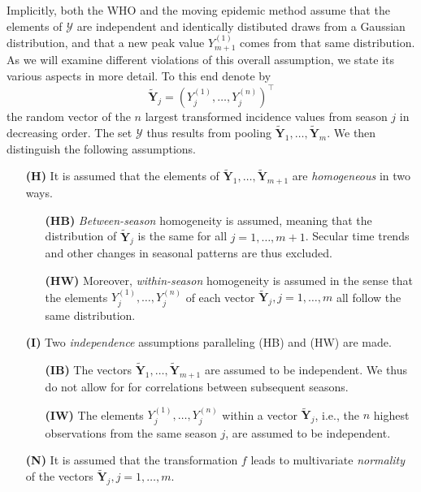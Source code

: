 \documentclass[12pt]{article}
\begin{document}
Implicitly, both the WHO and the moving epidemic method assume that the elements of $\mathcal{Y}$ are independent and identically distibuted draws from a Gaussian distribution, and that a new peak value $Y_{m + 1}^{(1)}$ comes from that same distribution. As we will examine different violations of this overall assumption, we state its various aspects in more detail. To this end denote by
\begin{equation}
\tilde{\mathbf{Y}}_j = (Y^{(1)}_j, \dots, Y^{(n)}_j)^\top\label{eq:Y_tilde}
\end{equation}
the random vector of the $n$ largest transformed incidence values from season $j$ in decreasing order. The set $\mathcal{Y}$ thus results from pooling $\tilde{\mathbf{Y}}_1, \dots, \tilde{\mathbf{Y}}_m$. We then distinguish the following assumptions.
\begin{itemize}
\item[\textbf{(H)}] It is assumed that the elements of $\tilde{\mathbf{Y}}_1, \dots, \tilde{\mathbf{Y}}_{m + 1}$ are \textit{homogeneous} in two ways.
\begin{itemize}
\item[\textbf{(HB)}] \textit{Between-season} homogeneity is assumed, meaning that the distribution of $\tilde{\mathbf{Y}}_j$ is the same for all $j = 1, \dots, m + 1$. Secular time trends and other changes in seasonal patterns are thus excluded.
\item[\textbf{(HW)}] Moreover, \textit{within-season} homogeneity is assumed in the sense that the elements $Y_j^{(1)}, \dots, Y_j^{(n)}$ of each vector $\tilde{\mathbf{Y}}_j, j = 1, \dots, m$ all follow the same distribution.
\end{itemize}
\item[\textbf{(I)}] Two \textit{independence} assumptions paralleling (HB) and (HW) are made.
\begin{itemize}
\item[\textbf{(IB)}] The vectors $\tilde{\mathbf{Y}}_1, \dots, \tilde{\mathbf{Y}}_{m + 1}$ are assumed to be independent. We thus do not allow for for correlations between subsequent seasons.
\item[\textbf{(IW)}] The elements $Y_j^{(1)}, \dots, Y_j^{(n)}$ within a vector $\tilde{\mathbf{Y}}_j$, i.e., the $n$ highest observations from the same season $j$, are assumed to be independent.
\end{itemize}
\item[\textbf{(N)}] It is assumed that the transformation $f$ leads to multivariate \textit{normality} of the vectors $\tilde{\mathbf{Y}}_j, j = 1, \dots, m$.
\end{itemize}
\end{document}
